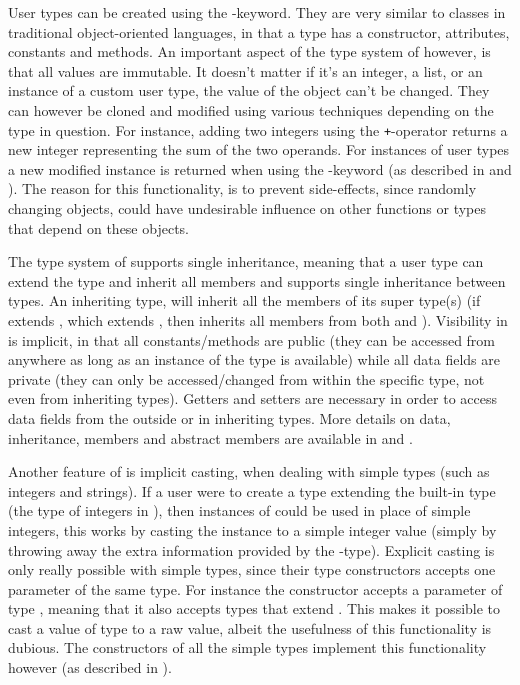 User types can be created using the -keyword. They are very
similar to classes in traditional object-oriented languages, in that a type has
a constructor, attributes, constants and methods. An important aspect of the
type system of \productname{} however, is that all values are immutable. It
doesn't matter if it's an integer, a list, or an instance of a custom user type,
the value of the object can't be changed. They can however be cloned and
modified using various techniques depending on the type in question. For
instance, adding two integers using the \texttt{+}-operator returns a new
integer representing the sum of the two operands. For instances of user types a
new modified instance is returned when using the -keyword (as
described in  and ). The
reason for this functionality, is to prevent side-effects, since randomly
changing objects, could have undesirable influence on other functions or types
that depend on these objects.

The type system of \productname{} supports single inheritance, meaning that a
user type  can extend the type  and inherit all members and 
\productname{} supports single inheritance between types. An inheriting type, will
inherit all the members of its super type(s) (if  extends , which
extends , then  inherits all members from both  and
). Visibility in \productname{} is implicit, in that all
constants/methods are public (they can be accessed from anywhere as long as an
instance of the type is available) while all data fields are private (they can
only be accessed/changed from within the specific type, not even from inheriting
types). Getters and setters are necessary in order to access data fields from
the outside or in inheriting types. More details on data, inheritance, members
and abstract members are available in  and
.

Another feature of \productname{} is implicit casting, when dealing with simple
types (such as integers and strings). If a user were to create a type
 extending the built-in type  (the type of
integers in \productname{}), then instances of  could be used in
place of simple integers, this works by casting the instance to a simple integer
value (simply by throwing away the extra information provided by the
-type). Explicit casting is only really possible with simple
types, since their type constructors accepts one parameter of the same type. For
instance the constructor  accepts a parameter of type
, meaning that it also accepts types that extend .
This makes it possible to cast a value of type  to a raw
 value, albeit the usefulness of this functionality is dubious.
The constructors of all the simple types implement this functionality however
(as described in ).

